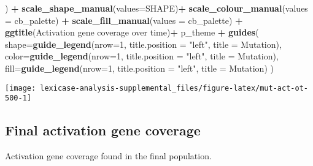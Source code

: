 \documentclass[
]{book}
\newenvironment{Shaded}{\begin{snugshade}}{\end{snugshade}}
\newcommand{\AttributeTok}[1]{\textcolor[rgb]{0.13,0.29,0.53}{#1}}
\newcommand{\DecValTok}[1]{\textcolor[rgb]{0.00,0.00,0.81}{#1}}
\newcommand{\FunctionTok}[1]{\textcolor[rgb]{0.13,0.29,0.53}{\textbf{#1}}}
\newcommand{\NormalTok}[1]{#1}
\newcommand{\SpecialCharTok}[1]{\textcolor[rgb]{0.81,0.36,0.00}{\textbf{#1}}}
\newcommand{\StringTok}[1]{\textcolor[rgb]{0.31,0.60,0.02}{#1}}
\begin{document}
\begin{Shaded}
\begin{Highlighting}[]
\NormalTok{  ) }\SpecialCharTok{+}
  \FunctionTok{scale\_shape\_manual}\NormalTok{(}\AttributeTok{values=}\NormalTok{SHAPE)}\SpecialCharTok{+}
  \FunctionTok{scale\_colour\_manual}\NormalTok{(}\AttributeTok{values =}\NormalTok{ cb\_palette) }\SpecialCharTok{+}
  \FunctionTok{scale\_fill\_manual}\NormalTok{(}\AttributeTok{values =}\NormalTok{ cb\_palette) }\SpecialCharTok{+}
  \FunctionTok{ggtitle}\NormalTok{(}\StringTok{\textquotesingle{}Activation gene coverage over time\textquotesingle{}}\NormalTok{)}\SpecialCharTok{+}
\NormalTok{  p\_theme }\SpecialCharTok{+}
  \FunctionTok{guides}\NormalTok{(}
    \AttributeTok{shape=}\FunctionTok{guide\_legend}\NormalTok{(}\AttributeTok{nrow=}\DecValTok{1}\NormalTok{, }\AttributeTok{title.position =} \StringTok{"left"}\NormalTok{, }\AttributeTok{title =} \StringTok{\textquotesingle{}Mutation\textquotesingle{}}\NormalTok{),}
    \AttributeTok{color=}\FunctionTok{guide\_legend}\NormalTok{(}\AttributeTok{nrow=}\DecValTok{1}\NormalTok{, }\AttributeTok{title.position =} \StringTok{"left"}\NormalTok{, }\AttributeTok{title =} \StringTok{\textquotesingle{}Mutation\textquotesingle{}}\NormalTok{),}
    \AttributeTok{fill=}\FunctionTok{guide\_legend}\NormalTok{(}\AttributeTok{nrow=}\DecValTok{1}\NormalTok{, }\AttributeTok{title.position =} \StringTok{"left"}\NormalTok{, }\AttributeTok{title =} \StringTok{\textquotesingle{}Mutation\textquotesingle{}}\NormalTok{)}
\NormalTok{  )}
\end{Highlighting}
\end{Shaded}

\texttt{[image: lexicase-analysis-supplemental\_files/figure-latex/mut-act-ot-500-1]}

\hypertarget{final-activation-gene-coverage-1}{%
\subsection{Final activation gene coverage}\label{final-activation-gene-coverage-1}}

Activation gene coverage found in the final population.
\end{document}
